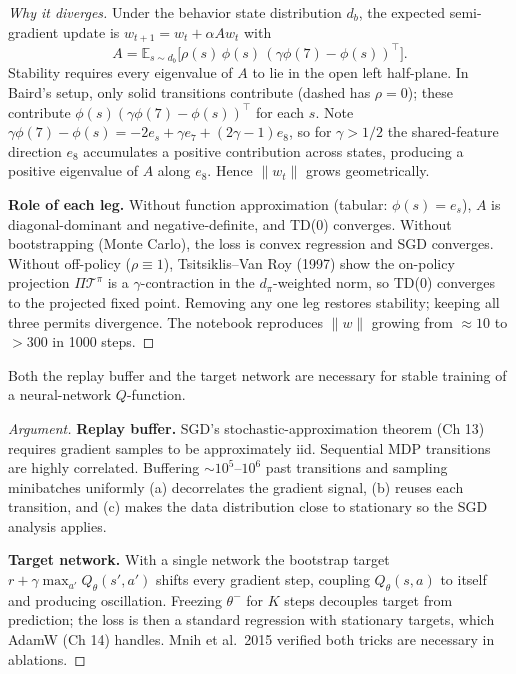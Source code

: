 \begin{proof}[Why it diverges]
Under the behavior state distribution $d_b$, the expected semi-gradient update is $w_{t+1}=w_t+\alpha A w_t$ with
\[
A=\mathbb{E}_{s\sim d_b}\!\big[\rho(s)\,\phi(s)\,(\gamma\phi(7)-\phi(s))^\top\big].
\]
Stability requires every eigenvalue of $A$ to lie in the open left half-plane. In Baird's setup, only solid transitions contribute (dashed has $\rho=0$); these contribute $\phi(s)(\gamma\phi(7)-\phi(s))^\top$ for each $s$. Note $\gamma\phi(7)-\phi(s)=-2e_s+\gamma e_7+(2\gamma-1)e_8$, so for $\gamma>1/2$ the shared-feature direction $e_8$ accumulates a positive contribution across states, producing a positive eigenvalue of $A$ along $e_8$. Hence $\|w_t\|$ grows geometrically.

\textbf{Role of each leg.} Without function approximation (tabular: $\phi(s)=e_s$), $A$ is diagonal-dominant and negative-definite, and TD(0) converges. Without bootstrapping (Monte Carlo), the loss is convex regression and SGD converges. Without off-policy ($\rho\equiv 1$), Tsitsiklis--Van Roy (1997) show the on-policy projection $\Pi\mathcal{T}^\pi$ is a $\gamma$-contraction in the $d_\pi$-weighted norm, so TD(0) converges to the projected fixed point. Removing any one leg restores stability; keeping all three permits divergence. The notebook reproduces $\|w\|$ growing from $\approx 10$ to $>300$ in 1000 steps.
\end{proof}

\begin{theorem}
Both the replay buffer and the target network are necessary for stable training of a neural-network $Q$-function.
\end{theorem}

\begin{proof}[Argument]
\textbf{Replay buffer.} SGD's stochastic-approximation theorem (Ch 13) requires gradient samples to be approximately iid. Sequential MDP transitions are highly correlated. Buffering $\sim 10^5$--$10^6$ past transitions and sampling minibatches uniformly (a) decorrelates the gradient signal, (b) reuses each transition, and (c) makes the data distribution close to stationary so the SGD analysis applies.

\textbf{Target network.} With a single network the bootstrap target $r+\gamma\max_{a'}Q_\theta(s',a')$ shifts every gradient step, coupling $Q_\theta(s,a)$ to itself and producing oscillation. Freezing $\theta^-$ for $K$ steps decouples target from prediction; the loss is then a standard regression with stationary targets, which AdamW (Ch 14) handles. Mnih et al.\ 2015 verified both tricks are necessary in ablations.
\end{proof}

